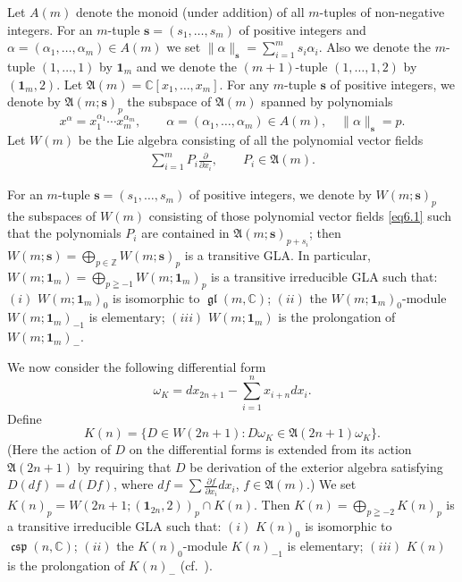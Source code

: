 \documentclass[pdftex]{sigma}
\numberwithin{equation}{section}
\numberwithin{theorem}{section}
\numberwithin{proposition}{section}
\numberwithin{lemma}{section}
\numberwithin{corollary}{section}
\numberwithin{definition}{section}
\numberwithin{example}{section}
\numberwithin{remark}{section}
\numberwithin{note}{section}
\newcommand{\gl}{\operatorname{\mathfrak{gl}}}
\newcommand{\csp}{\operatorname{\mathfrak{csp}}}
\begin{document}
Let $A(m)$ denote the monoid (under addition) of all $m$-tuples of
non-negative integers.
For an $m$-tuple
$\bm s=(s_1,\dots,s_m)$ of positive integers and
$\alpha=(\alpha_1,\dots,\alpha_m)\in A(m)$
we set $\|\alpha\|_{\bm s}=\sum\limits_{i=1}^ms_i\alpha_i$.
Also we denote the $m$-tuple $(1,\dots,1)$ by ${\bm 1}_m$
and  we denote the
$(m+1)$-tuple $(1,\dots,1,2)$ by $({\bm 1}_m,2)$.
Let $\mathfrak A(m)=\mathbb C[x_1,\dots,x_m]$.
For any $m$-tuple $\bm s$
of positive integers, we denote by $\mathfrak A(m;\bm s)_p$
the subspace of $\mathfrak A(m)$ spanned by polynomials
\[
x^{\alpha}=x_1^{\alpha_1}\cdots x_m^{\alpha_m}, \qquad
 \alpha=(\alpha_1,\dots,\alpha_m)\in A(m),\quad  \|\alpha\|_{\bm s}=p .
\]
Let $W(m)$ be the Lie algebra consisting of all the polynomial vector f\/ields
\begin{gather}\label{eq6.1}
\sum\limits_{i=1}^m P_i\frac{\partial}{\partial x_i},
\qquad  P_i\in\mathfrak A(m) .
\end{gather}

For an $m$-tuple $\bm s=(s_1,\dots,s_m)$ of positive integers,
we denote by $W(m;\bm s)_p$
the subspaces of $W(m)$ consisting of those polynomial vector f\/ields \eqref{eq6.1}
such that the polynomials $P_i$ are contained in
$\mathfrak A(m;\bm s)_{p+s_i}$;
then
$W(m;\bm s)=\bigoplus\limits_{p\in\mathbb Z}W(m;\bm s)_p$
is a transitive GLA.
In particular, $W(m;{\bm 1}_m)=\bigoplus\limits_{p\geqq-1}W(m;{\bm 1}_m)_p$ is
a transitive irreducible GLA
such that: $(i)$ $W(m;{\bm 1}_m)_0$ is isomorphic to $\gl(m,\mathbb C)$;
$(ii)$ the $W(m;{\bm 1}_m)_0$-module $W(m;{\bm 1}_m)_{-1}$ is elementary; $(iii)$
$W(m;{\bm 1}_m)$ is the prolongation of $W(m;{\bm 1}_m)_-$.

We now consider the following dif\/ferential form
\[
\omega_K=dx_{2n+1}-\sum_{i=1}^nx_{i+n}dx_{i}.
\]
Def\/ine
\[
K(n)=\{ D\in W(2n+1):D\omega_K\in\mathfrak A(2n+1)\omega_K \}.
\]
(Here the action of $D$ on the dif\/ferential forms is extended from
its action $\mathfrak A(2n+1)$ by requiring that $D$ be derivation of
the exterior algebra satisfying $D(df)=d(Df)$, where
$df=\sum\frac{\partial f}{\partial x_i}dx_i$, $f\in\mathfrak A(m)$.)
We set $K(n)_p=W(2n+1;({\bm 1}_{2n},2))_p\cap K(n)$.
Then $K(n)=\bigoplus\limits_{p\geqq-2}K(n)_p$
is a transitive irreducible GLA
such that: $(i)$
$K(n)_0$ is isomorphic to $\csp(n,\mathbb C)$;
$(ii)$ the $K(n)_0$-module $K(n)_{-1}$ is elementary;
$(iii)$ $K(n)$ is the prolongation of $K(n)_-$
(cf.~\cite{kac68:1, mor88:1}).
\end{document}
